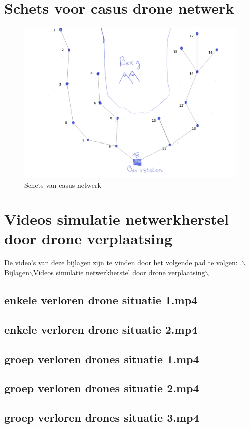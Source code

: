 \documentclass[a4paper, 11pt, oneside]{report}
\begin{document}



\clearpage
\appendix
\chapter{Schets voor casus drone netwerk}
 \label{app:schetsNetwerk}
\begin{figure}[H]
	\begin{center}\includegraphics[width=\linewidth]{schetsNetwerk}\end{center}
	\caption{Schets van casus netwerk}
	\label{fig:schetsNetwerk}
\end{figure}

\chapter{Videos simulatie netwerkherstel door drone verplaatsing}\label{sec:videos-simulatie-netwerkherstel-door-drone-verplaatsing}
De video's van deze bijlagen zijn te vinden door het volgende pad te volgen: \newline
.$\backslash$Bijlagen$\backslash$Videos simulatie netwerkherstel door drone verplaatsing$\backslash$
\section{enkele verloren drone situatie 1.mp4}\label{sec:enkele-verloren-drone-situatie-1mp4}
\section{enkele verloren drone situatie 2.mp4}\label{sec:enkele-verloren-drone-situatie-2mp4}
\section{groep verloren drones situatie 1.mp4}\label{sec:groep-verloren-drones-situatie-1mp4}
\section{groep verloren drones situatie 2.mp4}\label{sec:groep-verloren-drones-situatie-2mp4}
\section{groep verloren drones situatie 3.mp4}\label{sec:groep-verloren-drones-situatie-3mp4}
\end{document}
